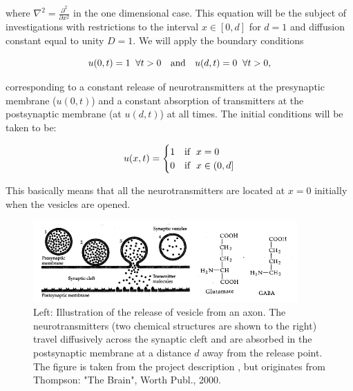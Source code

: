 \documentclass[a4paper, 11pt, notitlepage,english]{article}
\begin{document}
where $\nabla^2 = \frac{\partial^2}{\partial x^2}$ in the one dimensional case. This equation will be the subject of investigations with restrictions to the interval $x\in [0,d]$ for $d=1$ and diffusion constant equal to unity $D=1$. We will apply the boundary conditions

\begin{equation}
u(0,t) = 1 \hspace{2mm} \forall t > 0 \hspace{10pt} \mathrm{and} \hspace{10pt} u(d,t) = 0 \hspace{2mm} \forall t > 0,
\label{eq:Boundary_condition}
\end{equation}

corresponding to a constant release of neurotransmitters at the presynaptic membrane ($u(0,t)$) and a constant absorption of transmitters at the postsynaptic membrane (at $u(d,t)$) at all times. The initial conditions will be taken to be:

\begin{equation}
u(x,t) = \begin{cases} 1  & \mathrm{if} \hspace{2mm} x = 0 \\
0  & \mathrm{if} \hspace{2mm} x \in(0,d] \end{cases} 
\label{eq:Initial_conditions}
\end{equation}

This basically means that all the neurotransmitters are located at $x=0$ initially when the vesicles are opened. \\

\begin{figure}[h!tb]
 \centering
 \includegraphics[width=0.9\textwidth]{Synaptic_cleft_project}
 \caption{Left: Illustration of the release of vesicle from an axon. The neurotransmitters (two chemical structures are shown to the right) travel diffusively across the synaptic cleft and are absorbed in the postsynaptic membrane at a distance $d$ away from the release point. The figure is taken from the project description \cite{Komp3150}, but originates from Thompson: "The Brain", Worth Publ., 2000.}
\label{fig:Synaptic_cleft}
\end{figure}
\end{document}
